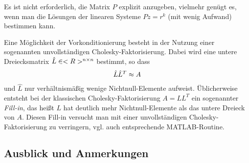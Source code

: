 Es ist nicht erforderlich, die Matrix $P$ explizit anzugeben, vielmehr genügt es, wenn man die Lösungen der linearen Systeme $Pz=r^k$ (mit wenig Aufwand) bestimmen kann.

Eine Möglichkeit der Vorkonditionierung besteht in der Nutzung einer sogenannten unvollständigen Cholesky-Faktorisierung. Dabei wird eine untere Dreiecksmatrix $\hat{L}\in<R>^{n \times n}$ bestimmt, so dass
\begin{align}
	\hat{L}\hat{L}^T\approx A\notag
\end{align}
und $\hat{L}$ nur verhältnismäßig wenige Nichtnull-Elemente aufweist. Üblicherweise entsteht bei der klassischen Cholesky-Faktorisierung $A=LL^T$ ein sogenannter \textit{Fill-in}, das heißt $L$ hat deutlich mehr Nichtnull-Elemente als das untere Dreieck von $A$. Diesen Fill-in versucht man mit einer unvollständigen Cholesky-Faktorisierung zu verringern, vgl. auch entsprechende MATLAB-Routine.

\subsection{Ausblick und Anmerkungen}

